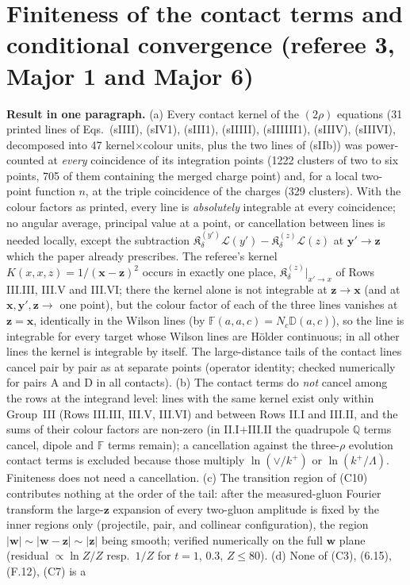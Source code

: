 \def\v#1{\mathbf{#1}}
\providecommand{\Kv}{\mathcal K}
\providecommand{\mf}[1]{\mathbb{#1}}
\section{Finiteness of the contact terms and conditional convergence (referee 3, Major 1 and Major 6)}\label{sec:ref3fin}

\noindent\textbf{Result in one paragraph.}
(a) Every contact kernel of the $(2\rho)$ equations (31 printed lines of Eqs.~(sIIII), (sIV1), (sIII1), (sIIIII), (sIIIIII1), (sIIIV), (sIIIVI), decomposed into 47 kernel$\times$colour units, plus the two lines of (sIIb)) was power-counted at \emph{every} coincidence of its integration points (1222 clusters of two to six points, 705 of them containing the merged charge point) and, for a local two-point function $n$, at the triple coincidence of the charges (329 clusters). With the colour factors as printed, every line is \emph{absolutely} integrable at every coincidence; no angular average, principal value at a point, or cancellation between lines is needed locally, except the subtraction $\mathfrak K^{(y')}_\delta\mathcal L(y')-\mathfrak K^{(z)}_\delta\mathcal L(z)$ at $\v y'\to\v z$ which the paper already prescribes. The referee's kernel $K(x,x,z)=1/(\v x-\v z)^2$ occurs in exactly one place, $\mathfrak K^{(z)}_\delta|_{x'\to x}$ of Rows III.III, III.V and III.VI; there the kernel alone is not integrable at $\v z\to\v x$ (and at $\v x,\v y',\v z\to$ one point), but the colour factor of each of the three lines vanishes at $\v z=\v x$, identically in the Wilson lines (by $\mf F(a,a,c)=N_c\mf D(a,c)$), so the line is integrable for every target whose Wilson lines are H\"older continuous; in all other lines the kernel is integrable by itself. The large-distance tails of the contact lines cancel pair by pair as at separate points (operator identity; checked numerically for pairs A and D in all contacts). (b) The contact terms do \emph{not} cancel among the rows at the integrand level: lines with the same kernel exist only within Group~III (Rows III.III, III.V, III.VI) and between Rows II.I and III.II, and the sums of their colour factors are non-zero (in II.I$+$III.II the quadrupole $\mf Q$ terms cancel, dipole and $\mf F$ terms remain); a cancellation against the three-$\rho$ evolution contact terms is excluded because those multiply $\ln(\vee/k^+)$ or $\ln(k^+/\Lambda)$. Finiteness does not need a cancellation. (c) The transition region of (C10) contributes nothing at the order of the tail: after the measured-gluon Fourier transform the large-$\v z$ expansion of every two-gluon amplitude is fixed by the inner regions only (projectile, pair, and collinear configuration), the region $|\v w|\sim|\v w-\v z|\sim|\v z|$ being smooth; verified numerically on the full $\v w$ plane (residual $\propto\ln Z/Z$ resp.\ $1/Z$ for $t=1$, $0.3$, $Z\le80$). (d) None of (C3), (6.15), (F.12), (C7) is a 